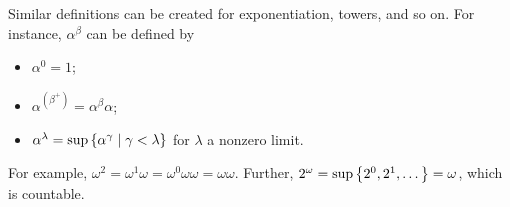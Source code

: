 Similar definitions can be created for exponentiation, towers, and so on.
For instance, \( \alpha^\beta \) can be defined by
\begin{itemize}
    \item \( \alpha^0 = 1 \);
    \item \( \alpha^(\beta^+) = \alpha^\beta \alpha \);
    \item \( \alpha^\lambda = \sup\qty{\alpha^\gamma \mid \gamma < \lambda} \) for \( \lambda \) a nonzero limit.
\end{itemize}
For example, \( \omega^2 = \omega^1 \omega = \omega^0 \omega \omega = \omega \omega \).
Further, \( 2^\omega = \sup\qty{2^0, 2^1, \dots} = \omega \), which is countable.
